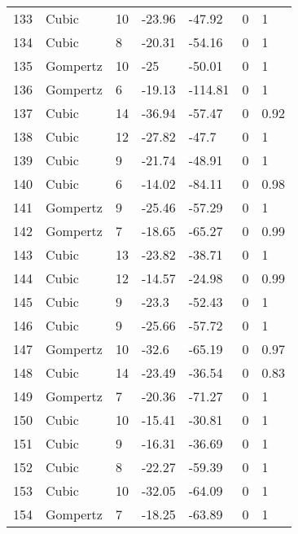\documentclass[11pt]{article}
\begin{document}
\begin{center}
\begin{longtable}{lllllll}
        133 & Cubic     & 10              & -23.96  & -47.92  & 0       & 1    \\
        134 & Cubic     & 8               & -20.31  & -54.16  & 0       & 1    \\
        135 & Gompertz  & 10              & -25     & -50.01  & 0       & 1    \\
        136 & Gompertz  & 6               & -19.13  & -114.81 & 0       & 1    \\
        137 & Cubic     & 14              & -36.94  & -57.47  & 0       & 0.92 \\
        138 & Cubic     & 12              & -27.82  & -47.7   & 0       & 1    \\
        139 & Cubic     & 9               & -21.74  & -48.91  & 0       & 1    \\
        140 & Cubic     & 6               & -14.02  & -84.11  & 0       & 0.98 \\
        141 & Gompertz  & 9               & -25.46  & -57.29  & 0       & 1    \\
        142 & Gompertz  & 7               & -18.65  & -65.27  & 0       & 0.99 \\
        143 & Cubic     & 13              & -23.82  & -38.71  & 0       & 1    \\
        144 & Cubic     & 12              & -14.57  & -24.98  & 0       & 0.99 \\
        145 & Cubic     & 9               & -23.3   & -52.43  & 0       & 1    \\
        146 & Cubic     & 9               & -25.66  & -57.72  & 0       & 1    \\
        147 & Gompertz  & 10              & -32.6   & -65.19  & 0       & 0.97 \\
        148 & Cubic     & 14              & -23.49  & -36.54  & 0       & 0.83 \\
        149 & Gompertz  & 7               & -20.36  & -71.27  & 0       & 1    \\
        150 & Cubic     & 10              & -15.41  & -30.81  & 0       & 1    \\
        151 & Cubic     & 9               & -16.31  & -36.69  & 0       & 1    \\
        152 & Cubic     & 8               & -22.27  & -59.39  & 0       & 1    \\
        153 & Cubic     & 10              & -32.05  & -64.09  & 0       & 1    \\
        154 & Gompertz  & 7               & -18.25  & -63.89  & 0       & 1    \\

\end{longtable}
\end{center}
\end{document}
